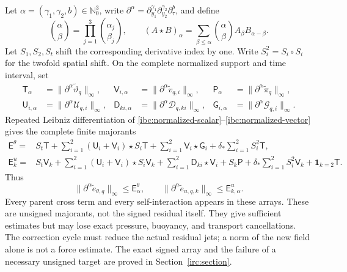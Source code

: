 Let $\alpha=(\gamma_1,\gamma_2,b)\in\mathbb N_0^3$, write
$\partial^\alpha=\partial_{y_1}^{\gamma_1}
\partial_{y_2}^{\gamma_2}\partial_\tau^b$, and define
\[
 \binom\alpha\beta=\prod_{j=1}^3\binom{\alpha_j}{\beta_j},
 \qquad
 (A\star B)_\alpha=\sum_{\beta\leq\alpha}
       \binom\alpha\beta A_\beta B_{\alpha-\beta}.
\]
Let $S_1,S_2,S_t$ shift the corresponding derivative index by one.
Write $S_i^2=S_i\circ S_i$ for the twofold spatial shift.
On the complete normalized support and time interval, set
\begin{align*}
 \mathsf T_\alpha&=\|\partial^\alpha\widetilde\vartheta_q\|_\infty,
 &\mathsf V_{i,\alpha}&=\|\partial^\alpha\widetilde v_{q,i}\|_\infty,
 &\mathsf P_\alpha&=\|\partial^\alpha\widetilde\pi_q\|_\infty,\\
 \mathsf U_{i,\alpha}&=\|\partial^\alpha\mathcal U_{q,i}\|_\infty,
 &\mathsf D_{ki,\alpha}&=\|\partial^\alpha\mathcal D_{q,ki}\|_\infty,
 &\mathsf G_{i,\alpha}&=\|\partial^\alpha\mathcal G_{q,i}\|_\infty.
\end{align*}
Repeated Leibniz differentiation of
\eqref{ibc:normalized-scalar}--\eqref{ibc:normalized-vector} gives the
complete finite majorants
\begin{align}
 \mathsf E^\theta={}&S_t\mathsf T
 +\sum_{i=1}^2(\mathsf U_i+\mathsf V_i)\star S_i\mathsf T
 +\sum_{i=1}^2\mathsf V_i\star\mathsf G_i
 +\delta_*\sum_{i=1}^2S_i^2\mathsf T,
 \label{ibc:scalar-array}\\
 \mathsf E^u_k={}&S_t\mathsf V_k
 +\sum_{i=1}^2(\mathsf U_i+\mathsf V_i)\star S_i\mathsf V_k
 +\sum_{i=1}^2\mathsf D_{ki}\star\mathsf V_i
 +S_k\mathsf P+\delta_*\sum_{i=1}^2S_i^2\mathsf V_k
 +\mathbf1_{k=2}\mathsf T.
 \label{ibc:vector-array}
\end{align}
Thus
\begin{equation}\label{ibc:array-bound}
 \|\partial^\alpha\widetilde e_{\theta,q}\|_\infty
 \leq\mathsf E^\theta_\alpha,\qquad
 \|\partial^\alpha\widetilde e_{u,q,k}\|_\infty
 \leq\mathsf E^u_{k,\alpha}.
\end{equation}
Every parent cross term and every self-interaction appears in these arrays.
These are unsigned majorants, not the signed residual itself.  They give
sufficient estimates but may lose exact pressure, buoyancy, and transport
cancellations.  The correction cycle must reduce the actual residual jets;
a norm of the new field alone is not a force estimate.  The exact signed
array and the failure of a necessary unsigned target are proved in
Section~\ref{irc:section}.

